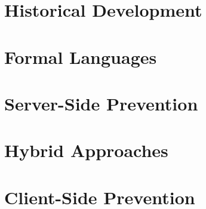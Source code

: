 \section{Historical Development}

\section{Formal Languages}
\section{Server-Side Prevention}
\section{Hybrid Approaches}
\section{Client-Side Prevention}


